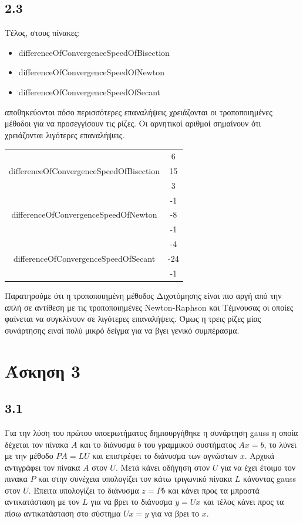 \documentclass[a4paper,11pt]{article}
\begin{document}
\begin{flushleft}
\subsection*{2.3}
Τέλος, στους πίνακες:
\begin{itemize}
    \item differenceOfConvergenceSpeedOfBisection
    \item differenceOfConvergenceSpeedOfNewton
    \item differenceOfConvergenceSpeedOfSecant
\end{itemize} 
αποθηκεύονται πόσο περισσότερες επαναλήψεις χρειάζονται	οι τροποποιημένες μέθοδοι για να προσεγγίσουν τις ρίζες. 
\newline
Οι αρνητικοί αριθμοί σημαίνουν ότι χρειάζονται λιγότερες επαναλήψεις.

\begin{center}
    \begin{tabular}{|c|c|}
        \hline
        \multirow{3}{*}{differenceOfConvergenceSpeedOfBisection} & 6 \\ \cline{2-2} & 15 \\ \cline{2-2} & 3 \\ \hline
        \multirow{3}{*}{differenceOfConvergenceSpeedOfNewton} & -1 \\ \cline{2-2} & -8 \\ \cline{2-2} & -1 \\ \hline
        \multirow{3}{*}{differenceOfConvergenceSpeedOfSecant} & -4 \\ \cline{2-2} & -24 \\ \cline{2-2} & -1 \\ \hline   
    \end{tabular}
\end{center}

Παρατηρούμε ότι η τροποποιημένη μέθοδος Διχοτόμησης είναι πιο αργή από την απλή σε αντίθεση με τις τροποποιημένες Newton-Raphson και Τέμνουσας οι οποίες φαίνεται να συγκλίνουν σε λιγότερες επαναλήψεις. Όμως η τρεις ρίζες μίας συνάρτησης ειναί πολύ μικρό δείγμα για να βγει γενικό συμπέρασμα. 
\newpage

\section*{Άσκηση 3}
\subsection*{3.1}
Για την λύση του πρώτου υποερωτήματος δημιουργήθηκε η συνάρτηση gauss η οποία δέχεται τον πίνακα $A$ και το διάνυσμα $b$ του γραμμικού συστήματος $Ax = b$, το λύνει με την μέθοδο $PA = LU$ και επιστρέφει το διάνυσμα των αγνώστων $x$.\newline
Αρχικά αντιγράφει τον πίνακα $A$ στον $U$. Μετά κάνει οδήγηση στον $U$ για να έχει έτοιμο τον πινακα $P$ και στην συνέχεια υπολογίζει τον κάτω τριγωνικό πίνακα $L$ κάνοντας gauss στον $U$. Έπειτα υπολογίζει το διάνυσμα $z = Pb$ και κάνει προς τα μπροστά αντικατάσταση με τον $L$ για να βρει το διάνυσμα $y = Ux$ και τέλος κάνει προς τα πίσω αντικατάσταση στο σύστημα $Ux=y$ για να βρει το $x$.


\end{flushleft}
\end{document}
